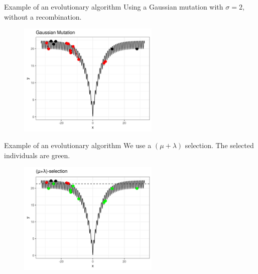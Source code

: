 \documentclass[11pt,compress,t,notes=noshow, xcolor=table]{beamer}
\begin{document}
\begin{vbframe}{Example of an evolutionary algorithm}
Using a Gaussian mutation with $\sigma=2$, without a recombination.
\vspace{0.5cm}

\begin{center}
\begin{figure}
  \includegraphics[width=0.6\textwidth]{figure_man/1dim-ackley-func-gaussian-mutation.png}
\end{figure}
\end{center}

\end{vbframe}


\begin{vbframe}{Example of an evolutionary algorithm}
We use a $(\mu + \lambda)$ selection. The selected individuals are green.

\vspace{0.5cm}

\begin{center}
\begin{figure}
  \includegraphics[width=0.6\textwidth]{figure_man/1dim-ackley-func-selection.png}
\end{figure}
\end{center}


\end{vbframe}
\end{document}
